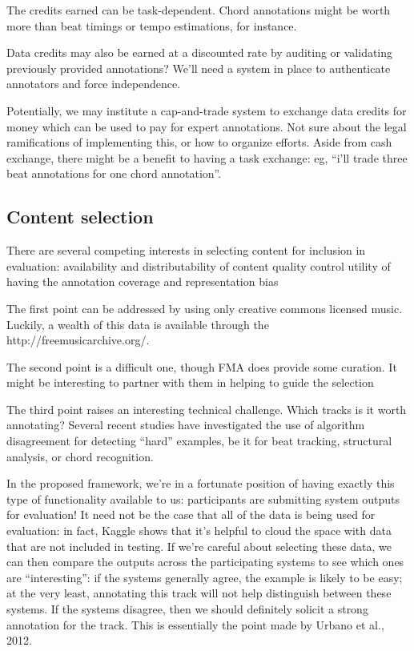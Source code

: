 \documentclass{article}
\begin{document}
The credits earned can be task-dependent.  Chord annotations might be worth more than beat timings or tempo estimations, for instance.

Data credits may also be earned at a discounted rate by auditing or validating previously provided annotations?  We’ll need a system in place to authenticate annotators and force independence.

Potentially, we may institute a cap-and-trade system to exchange data credits for money which can be used to pay for expert annotations.  Not sure about the legal ramifications of implementing this, or how to organize efforts.  Aside from cash exchange, there might be a benefit to having a task exchange: eg, “i’ll trade three beat annotations for one chord annotation”.


\subsection{Content selection}

There are several competing interests in selecting content for inclusion in evaluation:
availability and distributability of content
quality control
utility of having the annotation
coverage and representation bias

The first point can be addressed by using only creative commons licensed music.  Luckily, a wealth of this data is available through the http://freemusicarchive.org/.

The second point is a difficult one, though FMA does provide some curation.  It might be interesting to partner with them in helping to guide the selection

The third point raises an interesting technical challenge.  Which tracks is it worth annotating? Several recent studies have investigated the use of algorithm disagreement for detecting “hard” examples, be it for beat tracking, structural analysis, or chord recognition.

In the proposed framework, we’re in a fortunate position of having exactly this type of functionality available to us: participants are submitting system outputs for evaluation!  It need not be the case that all of the data is being used for evaluation: in fact, Kaggle shows that it’s helpful to cloud the space with data that are not included in testing.  If we’re careful about selecting these data, we can then compare the outputs across the participating systems to see which ones are “interesting”: if the systems generally agree, the example is likely to be easy; at the very least, annotating this track will not help distinguish between these systems.  If the systems disagree, then we should definitely solicit a strong annotation for the track.  This is essentially the point made by Urbano et al., 2012.
\end{document}
